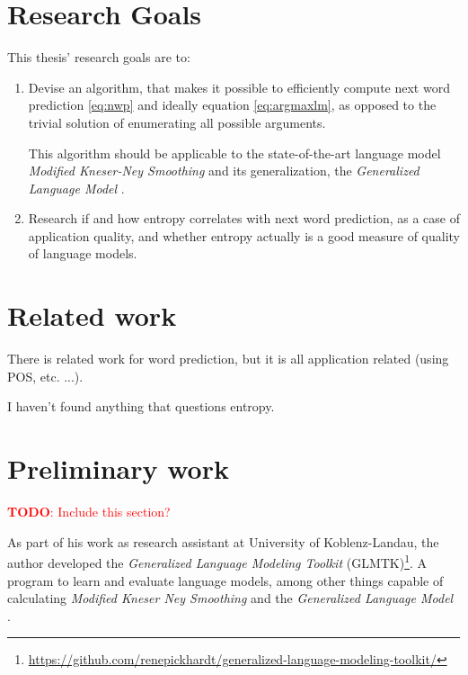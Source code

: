 \documentclass[11pt,a4paper]{article}
\newcommand{\todo}[1]{\textcolor{red}{\textbf{TODO}: #1}}
\begin{document}
\section{Research Goals}

This thesis' research goals are to:
\begin{enumerate}[label=(\alph*)]
  \item
    Devise an algorithm, that makes it possible to efficiently compute
    next word prediction \eqref{eq:nwp} and ideally equation
    \eqref{eq:argmaxlm}, as opposed to the trivial solution of enumerating
    all possible arguments.

    This algorithm should be applicable to the state-of-the-art language model
    \emph{Modified Kneser-Ney Smoothing} \parencite{ChenGoodman1999} and its
    generalization, the \emph{Generalized Language Model}
    \parencite{Pickhardt2014}.

  \item
    Research if and how entropy correlates with next word prediction, as a case
    of application quality, and whether entropy actually is a good measure of
    quality of language models.
\end{enumerate}

\section{Related work}

There is related work for word prediction, but it is all application related
(using POS, etc. ...).

I haven't found anything that questions entropy.

\section{Preliminary work}

\todo{Include this section?}

As part of his work as research assistant at University of Koblenz-Landau,
the author developed the \emph{Generalized Language Modeling Toolkit}
(GLMTK)\footnote{\url{https://github.com/renepickhardt/generalized-language-modeling-toolkit/}}.
A program to learn and evaluate language models, among other things capable of
calculating \emph{Modified Kneser Ney Smoothing} \parencite{ChenGoodman1999} and
the \emph{Generalized Language Model} \parencite{Pickhardt2014}.
\end{document}
